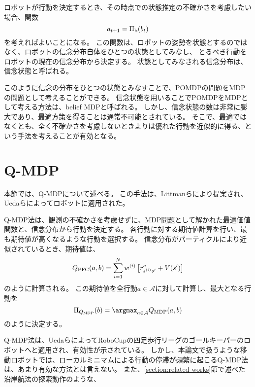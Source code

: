 ロボットが行動を決定するとき、その時点での状態推定の不確かさを考慮したい場合、関数
\begin{equation}
\label{policy belief}
  a_{t+1} = \Pi_{\rm b} (b_{t})
\end{equation}
を考えればよいことになる。
この関数は、ロボットの姿勢を状態とするのではなく、ロボットの信念分布自体をひとつの状態としてみなし、
とるべき行動をロボットの現在の信念分布から決定する。
状態としてみなされる信念分布は、信念状態と呼ばれる。

このように信念の分布をひとつの状態とみなすことで、POMDPの問題をMDPの問題として考えることができる。
信念状態を用いることでPOMDPをMDPとして考える方法は、belief MDPと呼ばれる\cite{kaelbling1998}。
しかし、信念状態の数は非常に膨大であり、最適方策を得ることは通常不可能とされている。
そこで、最適ではなくとも、全く不確かさを考慮しないときよりは優れた行動を近似的に得る、という手法を考えることが有効となる。


\section{Q-MDP} \label{section:q-mdp}
本節では、Q-MDPについて述べる。
この手法は、Littmanらにより提案され、Uedaらによってロボットに適用された\cite{littman1995, ueda2003iros}。

Q-MDP法は、観測の不確かさを考慮せずに、MDP問題として解かれた最適価値関数と、信念分布から行動を決定する。
各行動に対する期待値計算を行い、最も期待値が高くなるような行動を選択する。
信念分布がパーティクルにより近似されているとき、期待値は、
\begin{equation}
\label{equation:q-mdp}
  Q_{\rm PFC}(a, b) = \sum_{i=1}^{N} w^{(i)}
                      \left[r^{a}_{s^{(i)} s^{\prime}} + V(s^{\prime}) \right]
\end{equation}
のように計算される。
この期待値を全行動$a \in \mathcal{A}$に対して計算し、最大となる行動を
\begin{equation}
\label{equation:pi q-mdp}
  \Pi_{Q_{\rm MDP}}(b) = \argmax_{a \in \mathcal{A}} Q_{\rm MDP}(a, b)
\end{equation}
のように決定する。

Q-MDP法は、UedaらによってRoboCupの四足歩行リーグのゴールキーパーのロボットへと適用され、有効性が示されている\cite{ueda2003iros}。
しかし、本論文で扱うような移動ロボットでは、ローカルミニマムによる行動の停滞が頻繁に起こるQ-MDP法は、あまり有効な方法とは言えない。
また、\ref{section:related works}節で述べた沿岸航法の探索動作のような、

